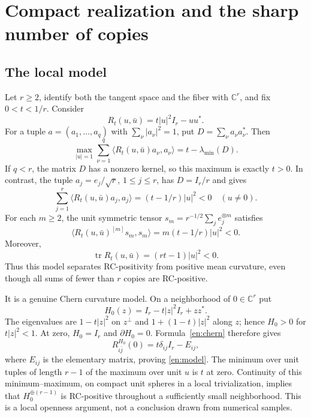 \documentclass[12pt]{amsart}
\theoremstyle{definition}
\theoremstyle{remark}
\numberwithin{equation}{section}
\DeclareMathOperator{\tr}{tr}
\theoremstyle{definition}
\begin{document}
\section{Compact realization and the sharp number of copies}
\label{en:compact}

\subsection{The local model}
Let $r\geq2$, identify both the tangent space and the fiber with
$\mathbb C^r$, and fix $0<t<1/r$. Consider
\begin{equation}\label{en:model}
 R_t(u,\bar u)=t|u|^2I_r-uu^*.
\end{equation}
For a tuple $a=(a_1,\ldots,a_q)$ with $\sum_\nu|a_\nu|^2=1$, put
$D=\sum_\nu a_\nu a_\nu^*$. Then
\begin{equation}\label{en:margin}
 \max_{|u|=1}\sum_{\nu=1}^q\langle R_t(u,\bar u)a_\nu,a_\nu\rangle
 =t-\lambda_{\min}(D).
\end{equation}
If $q<r$, the matrix $D$ has a nonzero kernel, so this maximum is exactly
$t>0$. In contrast, the tuple $a_j=e_j/\sqrt r$, $1\leq j\leq r$,
has $D=I_r/r$ and gives
\begin{equation}\label{en:badtuple}
 \sum_{j=1}^r\langle R_t(u,\bar u)a_j,a_j\rangle
 =(t-1/r)|u|^2<0\quad(u\ne0).
\end{equation}
For each $m\geq2$, the unit symmetric tensor
$s_m=r^{-1/2}\sum_je_j^{\otimes m}$ satisfies
\begin{equation}\label{en:badtensor}
 \langle R_t(u,\bar u)^{[m]}s_m,s_m\rangle
 =m(t-1/r)|u|^2<0.
\end{equation}
Moreover,
\begin{equation}\label{en:baddet}
 \tr R_t(u,\bar u)=(rt-1)|u|^2<0.
\end{equation}
Thus this model separates RC-positivity from positive mean curvature,
even though all sums of fewer than $r$ copies are RC-positive.

It is a genuine Chern curvature model. On a neighborhood of $0\in\mathbb C^r$
put
\begin{equation}\label{en:localmetric}
 H_0(z)=I_r-t|z|^2I_r+zz^*.
\end{equation}
The eigenvalues are $1-t|z|^2$ on $z^\perp$ and
$1+(1-t)|z|^2$ along $z$; hence $H_0>0$ for $t|z|^2<1$.
At zero, $H_0=I_r$ and $\partial H_0=0$. Formula~\eqref{en:chern}
therefore gives
\[
 R^{H_0}_{i\bar j}(0)=t\delta_{ij}I_r-E_{ij},
\]
where $E_{ij}$ is the elementary matrix, proving \eqref{en:model}.
The minimum over unit tuples of length $r-1$ of the maximum over unit
$u$ is $t$ at zero. Continuity of this minimum--maximum, on compact unit
spheres in a local trivialization, implies that $H_0^{\oplus(r-1)}$
is RC-positive throughout a sufficiently small neighborhood. This is a
local openness argument, not a conclusion drawn from numerical samples.
\end{document}
